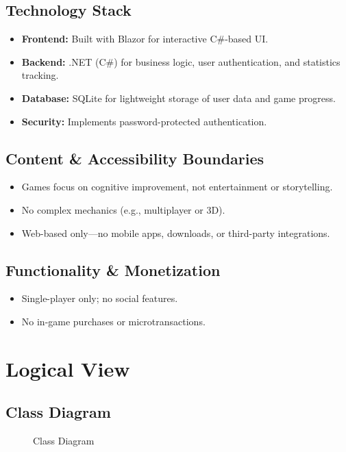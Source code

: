 \documentclass[11pt,a4paper]{article}
\newcommand{\inputdiagram}[1]{}
\begin{document}
\subsection{Technology Stack}
\begin{itemize}
    \item \textbf{Frontend:} Built with Blazor for interactive C\#-based UI.
    \item \textbf{Backend:} .NET (C\#) for business logic, user authentication, and statistics tracking.
    \item \textbf{Database:} SQLite for lightweight storage of user data and game progress.
    \item \textbf{Security:} Implements password-protected authentication.
\end{itemize}

\subsection{Content \& Accessibility Boundaries}
\begin{itemize}
    \item Games focus on cognitive improvement, not entertainment or storytelling.
    \item No complex mechanics (e.g., multiplayer or 3D).
    \item Web-based only—no mobile apps, downloads, or third-party integrations.
\end{itemize}

\subsection{Functionality \& Monetization}
\begin{itemize}
    \item Single-player only; no social features.
    \item No in-game purchases or microtransactions.
\end{itemize}



\section{Logical View}


\subsection{Class Diagram}

\begin{figure}[H]
     \centering
     \begin{adjustbox}{width=0.92\paperwidth,center}        \inputdiagram{class_diagram.tex}
     \end{adjustbox}
     \caption{Class Diagram}
     \label{fig:class_diagram}
\end{figure}
\end{document}
